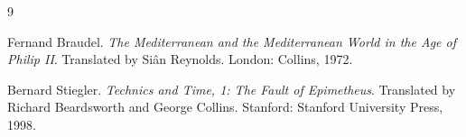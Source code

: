 \documentclass[12pt,a4paper]{article}
\begin{document}

\begin{thebibliography}{9}

Fernand Braudel.
\newblock \emph{The Mediterranean and the Mediterranean World in the Age of Philip II}.
\newblock Translated by Si\^{a}n Reynolds. London: Collins, 1972.

Bernard Stiegler.
\newblock \emph{Technics and Time, 1: The Fault of Epimetheus}.
\newblock Translated by Richard Beardsworth and George Collins. Stanford: Stanford University Press, 1998.

\end{thebibliography}
\end{document}
